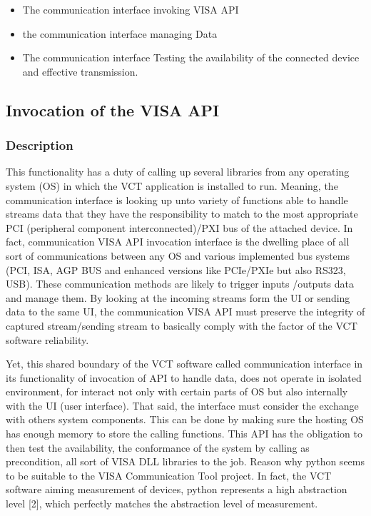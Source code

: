 \documentclass [10pt]{article}
\begin{document}
\begin{itemize}
\item The communication interface invoking VISA API
\item the communication interface managing Data
\item The communication interface Testing the availability of the connected device and effective transmission.
\end{itemize}

\subsection{Invocation of the VISA API}
\subsubsection{Description}

This functionality has a duty of calling up several libraries from any operating system (OS) in which the VCT application is installed to run. Meaning, the communication interface is looking up unto variety of functions able to handle streams data that they have the responsibility to match to the most appropriate PCI (peripheral component interconnected)/PXI bus of the attached device. In fact, communication VISA API invocation interface is the dwelling place of all sort of communications between any OS and various implemented bus systems (PCI, ISA, AGP BUS and enhanced versions like PCIe/PXIe but also RS323, USB). These communication methods are likely to trigger inputs /outputs data and manage them. By looking at the incoming streams form the UI or sending data to the same UI, the communication VISA API must preserve the integrity of captured stream/sending stream to basically comply with the factor of the VCT software reliability.
\par
Yet, this shared boundary of the VCT software called communication interface in its functionality of invocation of API to handle data, does not operate in isolated environment, for interact not only with certain parts of OS but also internally with the UI (user interface). That said, the interface must consider the exchange with others system components. This can be done by making sure the hosting OS has enough memory to store the calling functions. This API has the obligation to then test the availability, the conformance of the system by calling as precondition, all sort of VISA DLL libraries to the job. Reason why python seems to be suitable to the VISA Communication Tool project.
In fact, the VCT software aiming measurement of devices, python represents a high abstraction level [2], which perfectly matches the abstraction level of measurement.
\end{document}
